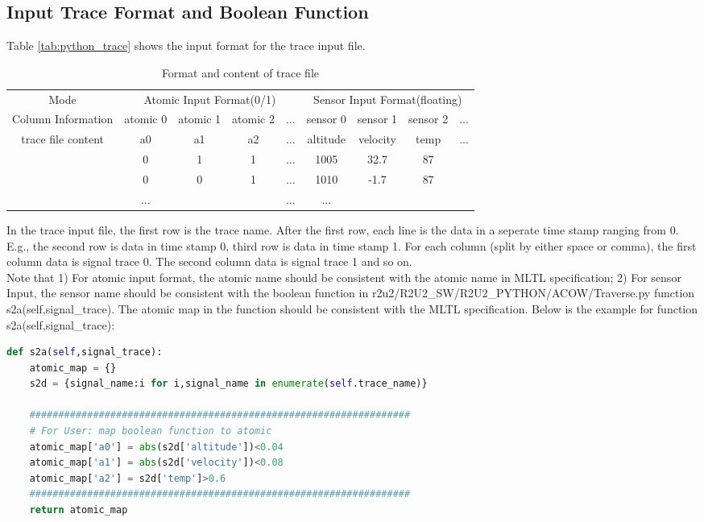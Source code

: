 \subsection{Input Trace Format and Boolean Function}
\label{sec:python_trace_format}
Table \ref{tab:python_trace} shows the input format for the trace input file.
\begin{table}[ht]
	\caption{Format and content of trace file}
	\label{tab:python_trace}
	\begin{center}
	\begin{tabular}{c|cccc|cccc}
		\hline
		Mode&\multicolumn{4}{c|}{Atomic Input Format(0/1)}&\multicolumn{4}{c}{Sensor Input Format(floating)}\\
		\cline{1-9}
		\multirow{1}{*}{Column Information}&atomic 0&atomic 1&atomic 2&\multicolumn{1}{c|}{...}&sensor 0&sensor 1&sensor 2&...\\
		\hline
		\multirow{3}{*}{trace file content}& a0 & a1 & a2 &...& altitude & velocity & temp &...\\
		& 0 & 1 & 1 &...  & 1005& 32.7 &87 \\
		& 0 & 0 & 1 &... & 1010& -1.7 &87  \\
		&...& & & ...& ...&  & \\
		\hline
	\end{tabular}
	\end{center}
	\label{tab:multicol}
	\end{table}
In the trace input file, the first row is the trace name. After the first row, each line is the data in a seperate time stamp ranging from 0. E.g., the second row is data in time stamp 0, third row is data in time stamp 1. For each column (split by either space or comma), the first column data is signal trace 0. The second column data is signal trace 1 and so on. \\
Note that 1) For atomic input format, the atomic name should be consistent with the atomic name in MLTL specification; 2) For sensor Input, the sensor name should be consistent with the boolean function in \colorbox{gray!30}{r2u2/R2U2\_SW/R2U2\_PYTHON/ACOW/Traverse.py} function \colorbox{blue!30}{s2a(self,signal\_trace)}. The atomic map in the function should be consistent with the MLTL specification. Below is the example for function \colorbox{blue!30}{s2a(self,signal\_trace)}:
\begin{lstlisting}[language=Python]
def s2a(self,signal_trace):	
	atomic_map = {}
	s2d = {signal_name:i for i,signal_name in enumerate(self.trace_name)}

	##################################################################
	# For User: map boolean function to atomic
	atomic_map['a0'] = abs(s2d['altitude'])<0.04
	atomic_map['a1'] = abs(s2d['velocity'])<0.08
	atomic_map['a2'] = s2d['temp']>0.6
	##################################################################
	return atomic_map
\end{lstlisting}

